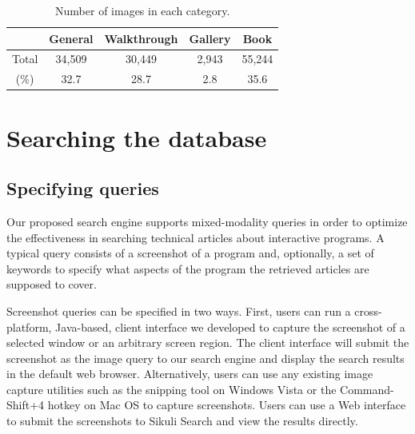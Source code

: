 \documentclass{www2010-submission}
\begin{document}
\begin{table}
\centering \caption{Number of images in each category.}
\label{tbl:category_distribution}

\begin{tabular}{|c|c|c|c|c|}
\hline
      & General & Walkthrough & Gallery & Book \\
\hline
Total & 34,509 & 30,449 & 2,943 & 55,244\\
 \hline
(\%)  & 32.7 & 28.7 & 2.8 & 35.6 \\
\hline
\end{tabular}

\end{table}





\section{Searching the database}

\subsection{Specifying queries}

Our proposed search engine supports mixed-modality queries in order to
optimize the effectiveness in searching technical articles about
interactive programs. A typical query consists of a screenshot of a
program and, optionally, a set of keywords to specify what aspects of
the program the retrieved articles are supposed to cover.

Screenshot queries can be specified in two ways. First, users can
run a cross-platform, Java-based, client interface we developed to
capture the screenshot of a selected window or an arbitrary screen
region. The client interface will submit the screenshot as the
image query to our search engine and display the search results in the
default web browser. Alternatively, users can use any existing
image capture utilities such as the snipping tool on Windows Vista
or the Command-Shift+4 hotkey on Mac OS to capture screenshots.
Users can use a Web interface to submit the screenshots to Sikuli
Search and view the results directly.
\end{document}
